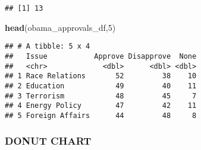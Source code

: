 \documentclass[
]{article}
\newenvironment{Shaded}{\begin{snugshade}}{\end{snugshade}}
\newcommand{\DecValTok}[1]{\textcolor[rgb]{0.00,0.00,0.81}{#1}}
\newcommand{\FunctionTok}[1]{\textcolor[rgb]{0.13,0.29,0.53}{\textbf{#1}}}
\newcommand{\NormalTok}[1]{#1}
\begin{document}
\begin{verbatim}
## [1] 13
\end{verbatim}

\begin{Shaded}
\begin{Highlighting}[]
\FunctionTok{head}\NormalTok{(obama\_approvals\_df,}\DecValTok{5}\NormalTok{)}
\end{Highlighting}
\end{Shaded}

\begin{verbatim}
## # A tibble: 5 x 4
##   Issue           Approve Disapprove  None
##   <chr>             <dbl>      <dbl> <dbl>
## 1 Race Relations       52         38    10
## 2 Education            49         40    11
## 3 Terrorism            48         45     7
## 4 Energy Policy        47         42    11
## 5 Foreign Affairs      44         48     8
\end{verbatim}

\hypertarget{donut-chart}{%
\subsubsection{DONUT CHART}\label{donut-chart}}
\end{document}
